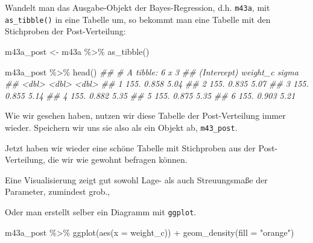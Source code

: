 \documentclass[
  a4paper,
  DIV=11]{scrreprt}
\newenvironment{Shaded}{\begin{snugshade}}{\end{snugshade}}
\newcommand{\AttributeTok}[1]{\textcolor[rgb]{0.40,0.45,0.13}{#1}}
\newcommand{\DocumentationTok}[1]{\textcolor[rgb]{0.37,0.37,0.37}{\textit{#1}}}
\newcommand{\FunctionTok}[1]{\textcolor[rgb]{0.28,0.35,0.67}{#1}}
\newcommand{\NormalTok}[1]{\textcolor[rgb]{0.00,0.23,0.31}{#1}}
\newcommand{\OtherTok}[1]{\textcolor[rgb]{0.00,0.23,0.31}{#1}}
\newcommand{\SpecialCharTok}[1]{\textcolor[rgb]{0.37,0.37,0.37}{#1}}
\newcommand{\StringTok}[1]{\textcolor[rgb]{0.13,0.47,0.30}{#1}}
\theoremstyle{definition}
\theoremstyle{remark}
\begin{document}
Wandelt man das Ausgabe-Objekt der Bayes-Regression, d.h. \texttt{m43a},
mit \texttt{as\_tibble()} in eine Tabelle um, so bekommt man eine
Tabelle mit den Stichproben der Post-Verteilung:

\begin{Shaded}
\begin{Highlighting}[]
\NormalTok{m43a\_post }\OtherTok{\textless{}{-}} 
\NormalTok{  m43a }\SpecialCharTok{\%\textgreater{}\%} 
  \FunctionTok{as\_tibble}\NormalTok{()}

\NormalTok{m43a\_post }\SpecialCharTok{\%\textgreater{}\%} 
  \FunctionTok{head}\NormalTok{()}
\DocumentationTok{\#\# \# A tibble: 6 x 3}
\DocumentationTok{\#\#   \textasciigrave{}(Intercept)\textasciigrave{} weight\_c sigma}
\DocumentationTok{\#\#           \textless{}dbl\textgreater{}    \textless{}dbl\textgreater{} \textless{}dbl\textgreater{}}
\DocumentationTok{\#\# 1          155.    0.858  5.04}
\DocumentationTok{\#\# 2          155.    0.835  5.07}
\DocumentationTok{\#\# 3          155.    0.855  5.14}
\DocumentationTok{\#\# 4          155.    0.882  5.35}
\DocumentationTok{\#\# 5          155.    0.875  5.35}
\DocumentationTok{\#\# 6          155.    0.903  5.21}
\end{Highlighting}
\end{Shaded}

Wie wir gesehen haben, nutzen wir diese Tabelle der Post-Verteilung
immer wieder. Speichern wir uns sie also als ein Objekt ab,
\texttt{m43\_post}.

Jetzt haben wir wieder eine schöne Tabelle mit Stichproben aus der
Post-Verteilung, die wir wie gewohnt befragen können.

Eine Visualisierung zeigt gut sowohl Lage- als auch Streuungsmaße der
Parameter, zumindest grob.,

Oder man erstellt selber ein Diagramm mit \texttt{ggplot}.

\begin{Shaded}
\begin{Highlighting}[]
\NormalTok{m43a\_post }\SpecialCharTok{\%\textgreater{}\%} 
  \FunctionTok{ggplot}\NormalTok{(}\FunctionTok{aes}\NormalTok{(}\AttributeTok{x =}\NormalTok{ weight\_c)) }\SpecialCharTok{+}
  \FunctionTok{geom\_density}\NormalTok{(}\AttributeTok{fill =} \StringTok{"orange"}\NormalTok{)}
\end{Highlighting}
\end{Shaded}
\end{document}

